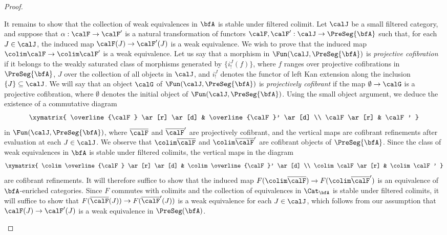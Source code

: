 \begin{proof}
\begin{itemize}
It remains to show that the collection of weak equivalences in $\bfA$ is stable under filtered colimit.
Let $\calJ$ be a small filtered category, and suppose that $\alpha: \calF \rightarrow \calF'$ is a natural
transformation of functors $\calF, \calF': \calJ \rightarrow \PreSeg{\bfA}$ such that, for each
$J \in \calJ$, the induced map $\calF(J) \rightarrow \calF'(J)$ is a weak equivalence. We wish to
prove that the induced map $\colim \calF \rightarrow \colim \calF'$ is a weak equivalence.
Let us say that a morphism in $\Fun(\calJ, \PreSeg{\bfA})$ is {\it projective cofibration} if it belongs
to the weakly saturated class of morphisms generated by $\{ i^{J}_{!}(f) \}$, where $f$ ranges
over projective cofibrations in $\PreSeg{\bfA}$, $J$ over the collection of all objects in $\calJ$, and
$i^{J}_{!}$ denotes the functor of left Kan extension along the inclusion $\{J\} \subseteq \calJ$.
We will say that an object $\calG$ of $\Fun(\calJ, \PreSeg{\bfA})$ is {\it projectively cofibrant} if the map
$\emptyset \rightarrow \calG$ is a projective cofibration, where $\emptyset$ denotes the initial object of $\Fun( \calJ, \PreSeg{\bfA})$. Using the small object argument, we deduce the existence of a commutative diagram
$$ \xymatrix{ \overline{\calF} \ar[r] \ar[d] & \overline{\calF}' \ar[d] \\
\calF \ar[r] & \calF' }$$
in $\Fun( \calJ, \PreSeg{\bfA})$, where $\overline{\calF}$ and $\overline{\calF}'$ are projectively cofibrant, and the vertical maps are cofibrant refinements after evaluation at each $J \in \calJ$. 
We observe that $\colim \overline{\calF}$ and $\colim \overline{\calF}'$ are cofibrant objects
of $\PreSeg{\bfA}$. Since the class of weak equivalences in $\bfA$ is stable under filtered colimits, the vertical maps in the diagram
$$ \xymatrix{ \colim \overline{\calF} \ar[r] \ar[d] & \colim \overline{\calF}' \ar[d] \\
\colim \calF \ar[r] & \colim \calF' }$$
are cofibrant refinements. It will therefore suffice to show that the induced map
$F( \colim \overline{\calF} ) \rightarrow F( \colim \overline \calF' )$ is an equivalence of
$\bfA$-enriched categories. Since $F$ commutes with colimits and the collection of equivalences
in $\Cat_{\bfA}$ is stable under filtered colimits, it will suffice to show that $F( \overline{\calF}(J) ) \rightarrow
F( \overline{\calF}'(J) )$ is a weak equivalence for each $J \in \calJ$, which follows from our assumption that $\calF(J) \rightarrow \calF'(J)$ is a weak equivalence in $\PreSeg(\bfA)$.


\end{itemize}
\end{proof}
